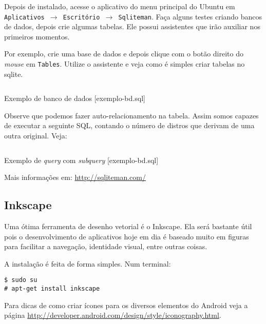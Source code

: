 Depois de instalado, acesse o aplicativo do menu principal do Ubuntu em \texttt{Aplicativos $\rightarrow$
Escritório $\rightarrow$ Sqliteman}. Faça alguns testes criando bancos de dados, depois crie algumas tabelas.
Ele possui assistentes que irão auxiliar nos primeiros momentos.

Por exemplo, crie uma base de dados e depois clique com o botão direito do \textit{mouse} em \texttt{Tables}.
Utilize o assistente e veja como é simples criar tabelas no sqlite.

\begin{listing}[H]
  \inputminted[linenos=true,frame=bottomline,tabsize=3]{ sql }{ source/exemplo-bd-1.sql }
  \caption{Exemplo de banco de dados [exemplo-bd.sql]}
\end{listing}

Observe que podemos fazer auto-relacionamento na tabela. Assim somos capazes de executar a seguinte SQL,
contando o número de distros que derivam de uma outra original. Veja:

\begin{listing}[H]
  \inputminted[linenos=true,frame=bottomline,tabsize=3]{ sql }{ source/exemplo-bd-2.sql }
  \caption{Exemplo de \textit{query} com \textit{subquery} [exemplo-bd.sql]}
\end{listing}

Mais informações em: \url{http://sqliteman.com/}

\subsection{Inkscape}

Uma ótima ferramenta de desenho vetorial é o Inkscape. Ela será bastante útil pois o desenvolvimento
de aplicativos hoje em dia é baseado muito em figuras para facilitar a navegação, identidade visual,
entre outras coisas.

A instalação é feita de forma simples. Num terminal:

\begin{flushleft}
\texttt{\$ sudo su\\
\# apt-get install inkscape\\}
\end{flushleft}

Para dicas de como criar ícones para os diversos elementos do Android veja a página
\url{http://developer.android.com/design/style/iconography.html}.
